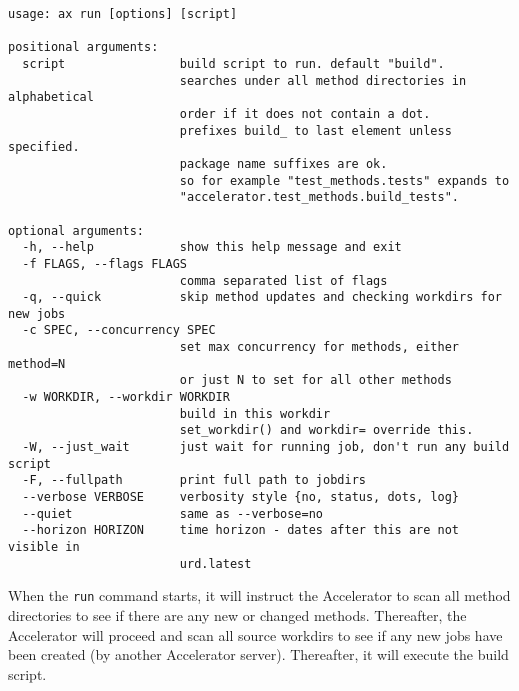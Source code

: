 \begin{snugshade}
\begin{verbatim}
usage: ax run [options] [script]

positional arguments:
  script                build script to run. default "build".
                        searches under all method directories in alphabetical
                        order if it does not contain a dot.
                        prefixes build_ to last element unless specified.
                        package name suffixes are ok.
                        so for example "test_methods.tests" expands to
                        "accelerator.test_methods.build_tests".

optional arguments:
  -h, --help            show this help message and exit
  -f FLAGS, --flags FLAGS
                        comma separated list of flags
  -q, --quick           skip method updates and checking workdirs for new jobs
  -c SPEC, --concurrency SPEC
                        set max concurrency for methods, either method=N
                        or just N to set for all other methods
  -w WORKDIR, --workdir WORKDIR
                        build in this workdir
                        set_workdir() and workdir= override this.
  -W, --just_wait       just wait for running job, don't run any build script
  -F, --fullpath        print full path to jobdirs
  --verbose VERBOSE     verbosity style {no, status, dots, log}
  --quiet               same as --verbose=no
  --horizon HORIZON     time horizon - dates after this are not visible in
                        urd.latest
\end{verbatim}
\end{snugshade}
When the \texttt{run} command starts, it will instruct the Accelerator
to scan all method directories to see if there are any new or changed
methods.  Thereafter, the Accelerator will proceed and scan all source
workdirs to see if any new jobs have been created (by another
Accelerator server).  Thereafter, it will execute the build script.




